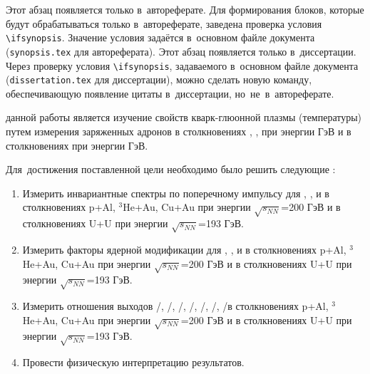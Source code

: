 \ifsynopsis
Этот абзац появляется только в~автореферате.
Для формирования блоков, которые будут обрабатываться только в~автореферате,
заведена проверка условия \verb!\!\verb!ifsynopsis!.
Значение условия задаётся в~основном файле документа (\verb!synopsis.tex! для
автореферата).
\else
Этот абзац появляется только в~диссертации.
Через проверку условия \verb!\!\verb!ifsynopsis!, задаваемого в~основном файле
документа (\verb!dissertation.tex! для диссертации), можно сделать новую
команду, обеспечивающую появление цитаты в~диссертации, но~не~в~автореферате.
\fi


{\aim} данной работы является изучение свойств  кварк-глюонной плазмы (температуры) путем измерения заряженных адронов в столкновениях \pal, \heau, \cuau при энергии  ГэВ и в столкновениях \uu при энергии  ГэВ.

Для~достижения поставленной цели необходимо было решить следующие {\tasks}:
\begin{enumerate}[beginpenalty=10000] %
 \item Измерить инвариантные спектры по поперечному импульсу для \pipm, \Kpm, \prot и \aprot в столкновениях  p+Al, $^{3}$He+Au, Cu+Au при энергии $\sqrt{s_{NN}}$=200 ГэВ и в столкновениях U+U при энергии $\sqrt{s_{NN}}$=193 ГэВ.
\item Измерить факторы ядерной модификации для \pipm, \Kpm, \prot и \aprot в столкновениях  p+Al, $^{3}$He+Au, Cu+Au при энергии $\sqrt{s_{NN}}$=200 ГэВ и в столкновениях U+U при энергии $\sqrt{s_{NN}}$=193 ГэВ.

\item Измерить отношения выходов \pim/\pip, \Km/\Kp, \prot/\aprot, \prot/\pip, \aprot/\pim, \Kp/\pip, \Km/\pim в столкновениях  p+Al, $^{3}$He+Au, Cu+Au при энергии $\sqrt{s_{NN}}$=200 ГэВ и в столкновениях U+U при энергии $\sqrt{s_{NN}}$=193 ГэВ.
\item Провести физическую интерпретацию результатов.
\end{enumerate}


